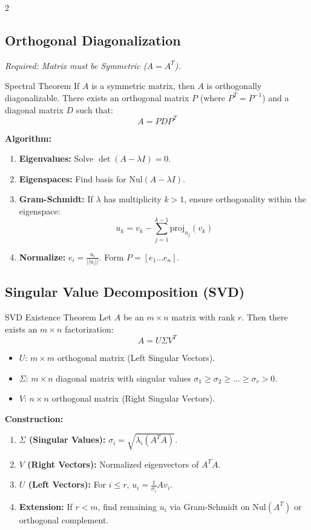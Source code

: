 \documentclass[10pt, letterpaper]{article}
\begin{document}
\begin{multicols*}{2}
\subsection{Orthogonal Diagonalization}
\textit{Required: Matrix must be Symmetric ($A=A^T$).}

\begin{theorbox}{Spectral Theorem}
If $A$ is a symmetric matrix, then $A$ is orthogonally diagonalizable. There exists an orthogonal matrix $P$ (where $P^T = P^{-1}$) and a diagonal matrix $D$ such that:
$$ A = PDP^T $$
\end{theorbox}

\textbf{Algorithm:}
\begin{enumerate}
    \item \textbf{Eigenvalues:} Solve $\det(A - \lambda I) = 0$.
    \item \textbf{Eigenspaces:} Find basis for $\text{Nul}(A - \lambda I)$.
    \item \textbf{Gram-Schmidt:} If $\lambda$ has multiplicity $k > 1$, ensure orthogonality within the eigenspace:
    $$ u_k = v_k - \sum_{j=1}^{k-1} \text{proj}_{u_j}(v_k) $$
    \item \textbf{Normalize:} $e_i = \frac{u_i}{||u_i||}$. Form $P = [e_1 \dots e_n]$.
\end{enumerate}

\subsection{Singular Value Decomposition (SVD)}
\begin{theorbox}{SVD Existence Theorem}
Let $A$ be an $m \times n$ matrix with rank $r$. Then there exists an $m \times n$ factorization:
$$ A = U \Sigma V^T $$
\begin{itemize}
    \item $U$: $m \times m$ orthogonal matrix (Left Singular Vectors).
    \item $\Sigma$: $m \times n$ diagonal matrix with singular values $\sigma_1 \ge \sigma_2 \ge \dots \ge \sigma_r > 0$.
    \item $V$: $n \times n$ orthogonal matrix (Right Singular Vectors).
\end{itemize}
\end{theorbox}

\textbf{Construction:}
\begin{enumerate}
    \item \textbf{$\Sigma$ (Singular Values):} $\sigma_i = \sqrt{\lambda_i(A^T A)}$.
    \item \textbf{$V$ (Right Vectors):} Normalized eigenvectors of $A^T A$.
    \item \textbf{$U$ (Left Vectors):} For $i \le r$, $u_i = \frac{1}{\sigma_i} A v_i$.
    \item \textbf{Extension:} If $r < m$, find remaining $u_i$ via Gram-Schmidt on $\text{Nul}(A^T)$ or orthogonal complement.
\end{enumerate}


\end{multicols*}
\end{document}
